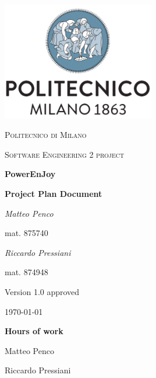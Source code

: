 \documentclass{report}
\begin{document}
\begin{titlepage}
	\centering
	\includegraphics[width=0.5\textwidth]{polimi-logo}\par\vspace{1cm}
	{\scshape\LARGE Politecnico di Milano\par}
	\vspace{1cm}
	{\scshape\Large Software Engineering 2 project\par}
	\vspace{1.5cm}
	{\Huge\bfseries PowerEnJoy\par}
	\vspace{0.5cm}
	{\Large\bfseries Project Plan Document\par}
	\vspace{2cm}
	\begin{multicols}{2}
		{\Large\itshape Matteo Penco\par}
		\vspace{0.25cm}
		mat. 875740
		\vfill\columnbreak
		{\Large\itshape Riccardo Pressiani\par}
		\vspace{0.25cm}
		mat. 874948
	\end{multicols}
	
	\vfill
	
	{\Large Version 1.0 approved\par}
	\vspace{1.25cm}
	{\large \today\par}
\end{titlepage}

\begin{versionhistory}
\end{versionhistory}

\vspace{5cm}
{\noindent\Huge\bfseries Hours of work\par}
\vspace{0.5cm}
{\noindent Matteo Penco	\par}
{\noindent Riccardo Pressiani \par}

\tableofcontents







\listoffigures
\begingroup
\let\clearpage\relax
\listoftables
\endgroup



\end{document}
